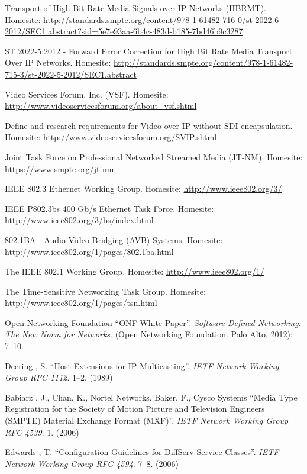 \documentclass[english,final]{setup/eetac_tfc_pfc}
\begin{document}
\begin{thebibliography}{2}
Transport of High Bit Rate Media Signals over IP Networks (HBRMT). Homesite: \url{http://standards.smpte.org/content/978-1-61482-716-0/st-2022-6-2012/SEC1.abstract?sid=5e7e93aa-6b4c-483d-b185-7bd46b9c3287}

ST 2022-5:2012 - Forward Error Correction for High Bit Rate Media Transport Over IP Networks. Homesite: \url{http://standards.smpte.org/content/978-1-61482-715-3/st-2022-5-2012/SEC1.abstract}

Video Services Forum, Inc. (VSF). Homesite: \url{http://www.videoservicesforum.org/about_vsf.shtml}

Define and research requirements for Video over IP without SDI encapsulation. Homesite: \url{http://www.videoservicesforum.org/SVIP.shtml}

Joint Task Force on Professional Networked Streamed Media (JT-NM). Homesite: \url{https://www.smpte.org/jt-nm}

IEEE 802.3 Ethernet Working Group. Homesite: \url{http://www.ieee802.org/3/}

IEEE P802.3bs 400 Gb/s Ethernet Task Force. Homesite: \url{http://www.ieee802.org/3/bs/index.html}

802.1BA - Audio Video Bridging (AVB) Systems. Homesite: \url{http://www.ieee802.org/1/pages/802.1ba.html}

The IEEE 802.1 Working Group. Homesite: \url{http://www.ieee802.org/1/}

The Time-Sensitive Networking Task Group. Homesite: \url{http://www.ieee802.org/1/pages/tsn.html}

Open Networking Foundation 
``ONF White Paper''. {\it Software-Defined Networking: The New Norm for Networks}.
(Open Networking Foundation. Palo Alto. 2012): 7--10.

Deering , S.
``Host Extensions for IP Multicasting''. {\it IETF Network Working Group RFC 1112}.
1--2. (1989) 

Babiarz , J., Chan, K., Nortel Networks, Baker, F., Cysco Systems
``Media Type Registration for the Society of Motion Picture and Television Engineers (SMPTE) Material Exchange Format (MXF)''. {\it IETF Network Working Group RFC 4539}.
1. (2006) 

Edwards , T.
``Configuration Guidelines for DiffServ Service Classes''. {\it IETF Network Working Group RFC 4594}.
7--8. (2006) 


\end{thebibliography}
\end{document}
